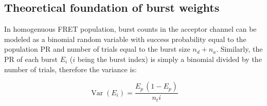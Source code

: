 \subsection{Theoretical foundation of burst weights}
\label{sec:burstweights_theory}
In homogenuous FRET population, burst counts in the acceptor channel can be
modeled as a binomial random variable with success probability equal to the
population PR and number of trials equal to the burst size $n_d + n_a$.
Similarly, the PR of each burst $E_i$ ($i$ being the burst index) is simply a binomial divided by the 
number of trials, therefore the variance is:

\begin{equation}
\label{eq:E_var}
\operatorname{Var} (E_i) = \frac{E_p\,(1-E_p)}{n_ti}
\end{equation}


